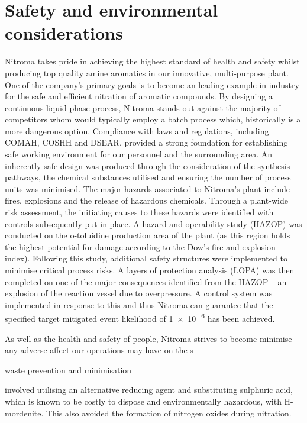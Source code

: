 \section*{Safety and environmental considerations}

Nitroma takes pride in achieving the highest standard of health and safety whilst producing top quality amine aromatics in our innovative, multi-purpose plant. One of the company's primary goals is to become an leading example in industry for the safe and efficient nitration of aromatic compounds. By designing a continuous liquid-phase process, Nitroma stands out against the majority of competitors whom would typically employ a batch process which, historically is a more dangerous option. Compliance with laws and regulations, including COMAH, COSHH and DSEAR, provided a strong foundation for establishing safe working environment for our personnel and the surrounding area. An inherently safe design was produced through the consideration of the synthesis pathways, the chemical substances utilised and ensuring the number of process units was minimised. The major hazards associated to Nitroma's plant include fires, explosions and the release of hazardous chemicals. Through a plant-wide risk assessment, the initiating causes to these hazards were identified with controls subsequently put in place. A hazard and operability study (HAZOP) was conducted on the o-toluidine production area of the plant (as this region holds the highest potential for damage according to the Dow's fire and explosion index). Following this study, additional safety structures were implemented to minimise critical process risks. A layers of protection analysis (LOPA) was then completed on one of the major consequences identified from the HAZOP – an explosion of the reaction vessel due to overpressure. A control system was implemented in response to this and thus Nitroma can guarantee that the specified target mitigated event likelihood of \num{1e-6} has been achieved.

As well as the health and safety of people, Nitroma strives to become minimise any adverse affcet our operations may have on the s 

waste prevention and minimisation 



involved utilising an alternative reducing agent and substituting sulphuric acid, which is known to be costly to dispose and environmentally hazardous, with H-mordenite. This also avoided the formation of nitrogen oxides during nitration.

